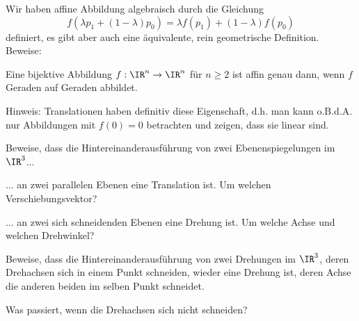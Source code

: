 \begin{sheet}

\begin{problem}[difficulty={Für $n=2$ relativ leicht, für $n=3$ mittelschwer, für $n>3$ mittelschwer bis schwer ohne Algebra}]
Wir haben affine Abbildung algebraisch durch die Gleichung
\[f(\lambda p_1 + (1-\lambda)p_0) = \lambda f(p_1)+(1-\lambda)f(p_0)\]
definiert, es gibt aber auch eine äquivalente, rein geometrische Definition. Beweise:

Eine bijektive Abbildung $f:\IR^n\to\IR^n$ für $n\geq 2$ ist affin genau dann, wenn $f$ Geraden auf Geraden abbildet.

Hinweis: Translationen haben definitiv diese Eigenschaft, d.h. man kann o.B.d.A. nur Abbildungen mit $f(0)=0$ betrachten und zeigen, dass sie linear sind.
\end{problem}

\begin{problem}[title={Komposition von Spiegelungen},difficulty={leicht bis mittel}]
Beweise, dass die Hintereinanderausführung von zwei Ebenenspiegelungen im $\IR^3$...
\begin{subproblem}
... an zwei parallelen Ebenen eine Translation ist. Um welchen Verschiebungsvektor?
\end{subproblem}
\begin{subproblem}
... an zwei sich schneidenden Ebenen eine Drehung ist. Um welche Achse und welchen Drehwinkel?
\end{subproblem}
\end{problem}

\begin{problem}[title={Komposition von Drehungen},difficulty={Schwerer als es scheint}]
Beweise, dass die Hintereinanderausführung von zwei Drehungen im $\IR^3$, deren Drehachsen sich in einem Punkt schneiden, wieder eine Drehung ist, deren Achse die anderen beiden im selben Punkt schneidet.

Was passiert, wenn die Drehachsen sich nicht schneiden?
\end{problem}


\end{sheet}
